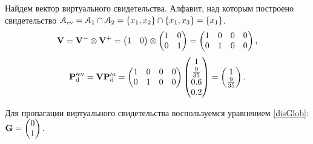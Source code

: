 Найдем вектор виртуального свидетельства. Алфавит, над которым построено свидетельство $\mathcal{A}_{\mathrm{ev}} = \mathcal{A}_1 \cap \mathcal{A}_2 = \{x_1, x_2\} \cap \{x_1, x_3\} = \{x_1\}$.
\begin{equation*}
\mathbf{V} = \mathbf{V}^- \otimes \mathbf{V}^+ =  \begin{pmatrix} 1 & 0  \end{pmatrix} \otimes
  \begin{pmatrix} 1 &0 \\ 0 & 1 \end{pmatrix} = \begin{pmatrix}
1 & 0  & 0 & 0 \\ 0 & 1 & 0 & 0
\end{pmatrix},
\end{equation*}
\begin{equation*}
\mathbf{P}_\mathrm{d}^{\prime \mathrm{ev}} = \mathbf{V}\mathbf{P}_\mathrm{d}^{\prime a} =  \begin{pmatrix}
1 & 0  & 0 & 0 \\ 0 & 1  & 0 & 0
\end{pmatrix} \begin{pmatrix}
1 \\  \frac{9}{35} \\ 0.6 \\ 0.2
\end{pmatrix} = \begin{pmatrix}
1 \\ \frac{9}{35}
\end{pmatrix}.
\end{equation*} 

Для пропагации виртуального свидетельства воспользуемся уравнением \ref{disGlob}:
$\mathbf{G} = \begin{pmatrix} 0 \\ 1\end{pmatrix}.$

